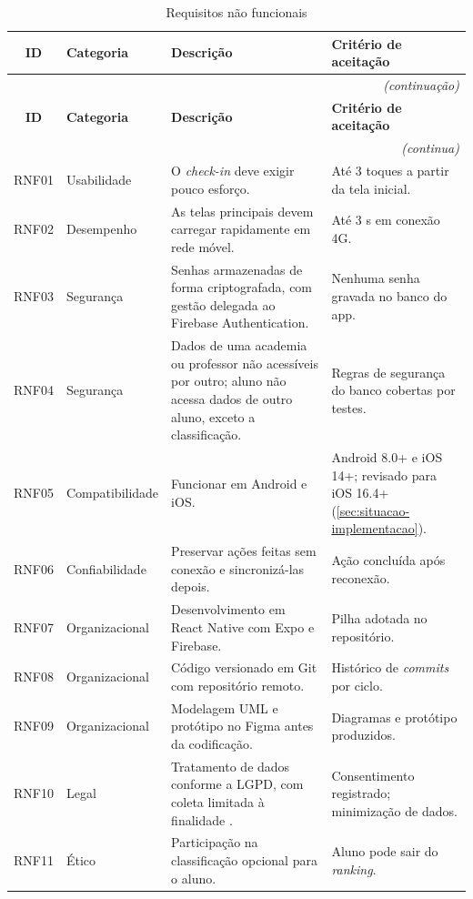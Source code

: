 \begin{quadrolongo}
\begin{longtable}{|c|p{2.3cm}|p{7.0cm}|p{3.6cm}|}
  \caption{Requisitos não funcionais}\label{qua:rnf}\\
  \hline
  \textbf{ID} & \textbf{Categoria} & \textbf{Descrição} & \textbf{Critério de aceitação} \\ \hline
\endfirsthead
  \multicolumn{4}{r}{\textit{(continuação)}}\\
  \hline
  \textbf{ID} & \textbf{Categoria} & \textbf{Descrição} & \textbf{Critério de aceitação} \\ \hline
\endhead
  \multicolumn{4}{r}{\textit{(continua)}}\\
\endfoot
\endlastfoot
    RNF01 & Usabilidade & O \textit{check-in} deve exigir pouco esforço. & Até 3 toques a partir da tela inicial. \\ \hline
    RNF02 & Desempenho & As telas principais devem carregar rapidamente em rede móvel. & Até 3 s em conexão 4G. \\ \hline
    RNF03 & Segurança & Senhas armazenadas de forma criptografada, com gestão delegada ao Firebase Authentication. & Nenhuma senha gravada no banco do app. \\ \hline
    RNF04 & Segurança & Dados de uma academia ou professor não acessíveis por outro; aluno não acessa dados de outro aluno, exceto a classificação. & Regras de segurança do banco cobertas por testes. \\ \hline
    RNF05 & Compatibilidade & Funcionar em Android e iOS. & Android 8.0+ e iOS 14+; revisado para iOS 16.4+ (\autoref{sec:situacao-implementacao}). \\ \hline
    RNF06 & Confiabilidade & Preservar ações feitas sem conexão e sincronizá-las depois. & Ação concluída após reconexão. \\ \hline
    RNF07 & Organizacional & Desenvolvimento em React Native com Expo e Firebase. & Pilha adotada no repositório. \\ \hline
    RNF08 & Organizacional & Código versionado em Git com repositório remoto. & Histórico de \textit{commits} por ciclo. \\ \hline
    RNF09 & Organizacional & Modelagem UML e protótipo no Figma antes da codificação. & Diagramas e protótipo produzidos. \\ \hline
    RNF10 & Legal & Tratamento de dados conforme a LGPD, com coleta limitada à finalidade \cite{lgpd2018}. & Consentimento registrado; minimização de dados. \\ \hline
    RNF11 & Ético & Participação na classificação opcional para o aluno. & Aluno pode sair do \textit{ranking}. \\ \hline
\end{longtable}
\end{quadrolongo}

